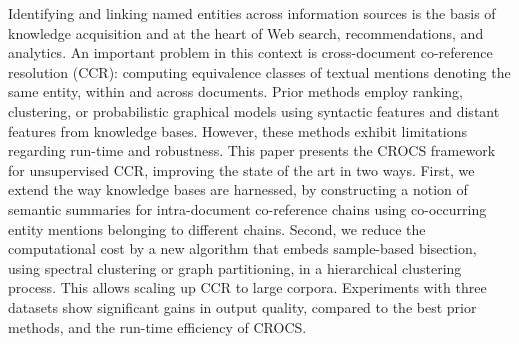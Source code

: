 Identifying and linking named entities across information sources is the basis of knowledge acquisition and at the heart of Web search, recommendations, and analytics. An important problem in this context is cross-document co-reference resolution (CCR): computing equivalence classes of textual mentions denoting the same entity, within and across documents. Prior methods employ ranking, clustering, or probabilistic graphical models using syntactic features and distant features from knowledge bases. However, these methods exhibit limitations regarding run-time and robustness. This paper presents the CROCS framework for unsupervised CCR, improving the state of the art in two ways. First, we extend the way knowledge bases are harnessed, by constructing a notion of semantic summaries for intra-document co-reference chains using co-occurring entity mentions belonging to different chains. Second, we reduce the computational cost by a new algorithm that embeds sample-based bisection, using spectral clustering or graph partitioning, in a hierarchical clustering process. This allows scaling up CCR to large corpora. Experiments with three datasets show significant gains in output quality, compared to the best prior methods, and the run-time efficiency of CROCS.
